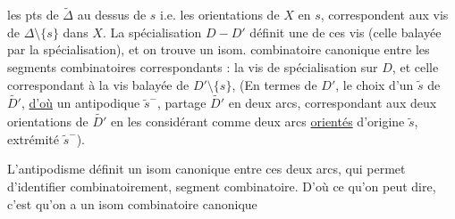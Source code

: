 
les pts de $\widetilde\Delta$ au dessus de $s$ i.e. les orientations de $X$ en $s$, correspondent aux  vis de $\Delta\setminus\{s\}$ dans $X$. La spécialisation $D\mathbin{-}D'$ définit une de ces vis (celle balayée par la spécialisation), et on trouve un isom. combinatoire canonique entre les segments combinatoires correspondants : la vis de spécialisation sur $D$, et celle correspondant à  la vis balayée de $D'\setminus\{s\}$,  (En termes de $D'$, le choix d'un   $\widetilde s$ de $\widetilde{D'}$, \uline{d'où} un antipodique $\widetilde s^-$, partage $\widetilde{D'}$ en deux arcs, correspondant aux deux orientations de $\widetilde{D'}$ en les considérant comme  deux arcs \uline{orientés} d'origine $\widetilde s$, extrémité $\widetilde s^-$).



L'antipodisme définit un isom canonique entre ces deux arcs, qui permet  d'identifier combinatoirement,   segment combinatoire. D'où ce qu'on peut dire, c'est qu'on a un isom combinatoire canonique
